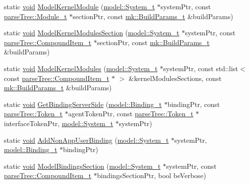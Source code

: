 \begin{DoxyCompactItemize}
static \hyperlink{_t_e_m_p_l_a_t_e__cdef_8h_ac9c84fa68bbad002983e35ce3663c686}{void} \hyperlink{namespacemodeller_a17c7ac43c9bbdb4cd9b177bc229608eb}{Model\+Kernel\+Module} (\hyperlink{structmodel_1_1_system__t}{model\+::\+System\+\_\+t} $\ast$system\+Ptr, const \hyperlink{structparse_tree_1_1_module__t}{parse\+Tree\+::\+Module\+\_\+t} $\ast$section\+Ptr, const \hyperlink{structmk_1_1_build_params__t}{mk\+::\+Build\+Params\+\_\+t} \&build\+Params)
\item 
static \hyperlink{_t_e_m_p_l_a_t_e__cdef_8h_ac9c84fa68bbad002983e35ce3663c686}{void} \hyperlink{namespacemodeller_a8b5726eba3bb9f2cc67229083e848861}{Model\+Kernel\+Modules\+Section} (\hyperlink{structmodel_1_1_system__t}{model\+::\+System\+\_\+t} $\ast$system\+Ptr, const \hyperlink{structparse_tree_1_1_compound_item__t}{parse\+Tree\+::\+Compound\+Item\+\_\+t} $\ast$section\+Ptr, const \hyperlink{structmk_1_1_build_params__t}{mk\+::\+Build\+Params\+\_\+t} \&build\+Params)
\item 
static \hyperlink{_t_e_m_p_l_a_t_e__cdef_8h_ac9c84fa68bbad002983e35ce3663c686}{void} \hyperlink{namespacemodeller_a83ad69f9f9cbe1523d77175b6589a132}{Model\+Kernel\+Modules} (\hyperlink{structmodel_1_1_system__t}{model\+::\+System\+\_\+t} $\ast$system\+Ptr, const std\+::list$<$ const \hyperlink{structparse_tree_1_1_compound_item__t}{parse\+Tree\+::\+Compound\+Item\+\_\+t} $\ast$ $>$ \&kernel\+Modules\+Sections, const \hyperlink{structmk_1_1_build_params__t}{mk\+::\+Build\+Params\+\_\+t} \&build\+Params)
\item 
static \hyperlink{_t_e_m_p_l_a_t_e__cdef_8h_ac9c84fa68bbad002983e35ce3663c686}{void} \hyperlink{namespacemodeller_a853870fb8969cfa17cc573820e4ec596}{Get\+Binding\+Server\+Side} (\hyperlink{structmodel_1_1_binding__t}{model\+::\+Binding\+\_\+t} $\ast$binding\+Ptr, const \hyperlink{structparse_tree_1_1_token__t}{parse\+Tree\+::\+Token\+\_\+t} $\ast$agent\+Token\+Ptr, const \hyperlink{structparse_tree_1_1_token__t}{parse\+Tree\+::\+Token\+\_\+t} $\ast$interface\+Token\+Ptr, \hyperlink{structmodel_1_1_system__t}{model\+::\+System\+\_\+t} $\ast$system\+Ptr)
\item 
static \hyperlink{_t_e_m_p_l_a_t_e__cdef_8h_ac9c84fa68bbad002983e35ce3663c686}{void} \hyperlink{namespacemodeller_a37e0058ebadd4ceb167f528b29b55176}{Add\+Non\+App\+User\+Binding} (\hyperlink{structmodel_1_1_system__t}{model\+::\+System\+\_\+t} $\ast$system\+Ptr, \hyperlink{structmodel_1_1_binding__t}{model\+::\+Binding\+\_\+t} $\ast$binding\+Ptr)
\item 
static \hyperlink{_t_e_m_p_l_a_t_e__cdef_8h_ac9c84fa68bbad002983e35ce3663c686}{void} \hyperlink{namespacemodeller_a9d9f8d7a68fd7a52c06fc224026354e7}{Model\+Bindings\+Section} (\hyperlink{structmodel_1_1_system__t}{model\+::\+System\+\_\+t} $\ast$system\+Ptr, const \hyperlink{structparse_tree_1_1_compound_item__t}{parse\+Tree\+::\+Compound\+Item\+\_\+t} $\ast$bindings\+Section\+Ptr, bool be\+Verbose)

\end{DoxyCompactItemize}
